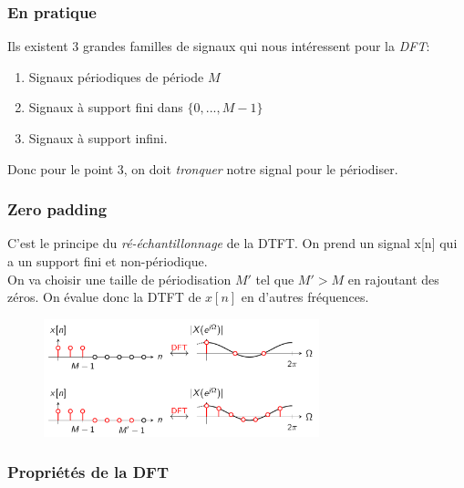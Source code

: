 \documentclass{report}
\begin{document}
\subsubsection{En pratique}
Ils existent 3 grandes familles de signaux qui nous intéressent pour la \textit{DFT}:
\begin{enumerate}
\item Signaux périodiques de période $M$
\item Signaux à support fini dans $\{0, ..., M-1\}$
\item Signaux à support infini.
\end{enumerate}
Donc pour le point 3, on doit \textit{tronquer} notre signal pour le périodiser.

\subsubsection{Zero padding}
C'est le principe du \textit{ré-échantillonnage} de la DTFT. On prend un signal x[n] qui a un support fini et non-périodique.\\
On va choisir une taille de périodisation $M'$ tel que $M'>M$ en rajoutant des zéros. On évalue donc la DTFT de $x[n]$ en d'autres fréquences.
\begin{figure}[H]
\centering
\includegraphics[width=8cm]{img/zero.png}
\end{figure}

\subsubsection{Propriétés de la DFT}
\end{document}
